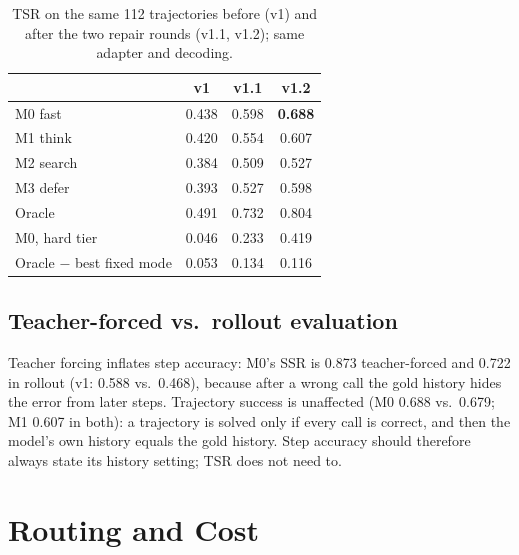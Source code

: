 \documentclass[conference,a4paper]{IEEEtran}
\begin{document}
\begin{table}[t]
\caption{TSR on the same 112 trajectories before (v1) and after the two repair
rounds (v1.1, v1.2); same adapter and decoding.}
\label{tab:versions}
\centering
\footnotesize
\begin{tabular}{lccc}
\toprule
& v1 & v1.1 & v1.2 \\
\midrule
M0 fast   & 0.438 & 0.598 & \textbf{0.688} \\
M1 think  & 0.420 & 0.554 & 0.607 \\
M2 search & 0.384 & 0.509 & 0.527 \\
M3 defer  & 0.393 & 0.527 & 0.598 \\
Oracle    & 0.491 & 0.732 & 0.804 \\
\midrule
M0, hard tier & 0.046 & 0.233 & 0.419 \\
Oracle $-$ best fixed mode & 0.053 & 0.134 & 0.116 \\
\bottomrule
\end{tabular}
\end{table}

\subsection{Teacher-forced vs.\ rollout evaluation}
Teacher forcing inflates step accuracy: M0's SSR is 0.873 teacher-forced and
0.722 in rollout (v1: 0.588 vs.\ 0.468), because after a wrong call the gold
history hides the error from later steps. Trajectory success is unaffected
(M0 0.688 vs.\ 0.679; M1 0.607 in both): a trajectory is solved only if every
call is correct, and then the model's own history equals the gold history.
Step accuracy should therefore always state its history setting; TSR does not
need to.

\section{Routing and Cost}
\end{document}
